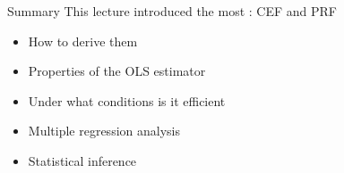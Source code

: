 \begin{frame}{Summary}
This lecture introduced the most 
\pause
\vfill
{}: CEF and PRF
\pause
\vfill
{}
\begin{itemize}
\item How to derive them
\item Properties of the OLS estimator
\item Under what conditions is it efficient
\end{itemize}
\vfill
\pause
{}
\begin{itemize}
\item Multiple regression analysis
\item Statistical inference
\end{itemize}


\end{frame}

